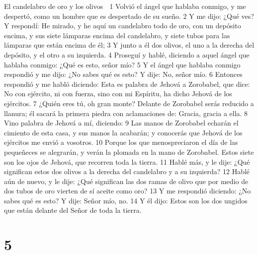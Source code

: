 El candelabro de oro y los olivos

1 Volvió el ángel que hablaba conmigo, y me despertó, como un hombre que es despertado de su sueño.
2 Y me dijo: ¿Qué ves? Y respondí: He mirado, y he aquí un candelabro todo de oro, con un depósito encima, y sus siete lámparas encima del candelabro, y siete tubos para las lámparas que están encima de él;
3 Y junto a él dos olivos, el uno a la derecha del depósito, y el otro a su izquierda.
4 Proseguí y hablé, diciendo a aquel ángel que hablaba conmigo: ¿Qué es esto, señor mío?
5 Y el ángel que hablaba conmigo respondió y me dijo: ¿No sabes qué es esto? Y dije: No, señor mío.
6 Entonces respondió y me habló diciendo: Esta es palabra de Jehová a Zorobabel, que dice: No con ejército, ni con fuerza, sino con mi Espíritu, ha dicho Jehová de los ejércitos.
7 ¿Quién eres tú, oh gran monte? Delante de Zorobabel serás reducido a llanura; él sacará la primera piedra con aclamaciones de: Gracia, gracia a ella.
8 Vino palabra de Jehová a mí, diciendo:
9 Las manos de Zorobabel echarán el cimiento de esta casa, y sus manos la acabarán; y conocerás que Jehová de los ejércitos me envió a vosotros.
10 Porque los que menospreciaron el día de las pequeñeces se alegrarán, y verán la plomada en la mano de Zorobabel. Estos siete son los ojos de Jehová, que recorren toda la tierra.
11 Hablé más, y le dije: ¿Qué significan estos dos olivos a la derecha del candelabro y a su izquierda?
12 Hablé aún de nuevo, y le dije: ¿Qué significan las dos ramas de olivo que por medio de dos tubos de oro vierten de sí aceite como oro?
13 Y me respondió diciendo: ¿No sabes qué es esto? Y dije: Señor mío, no.
14 Y él dijo: Estos son los dos ungidos que están delante del Señor de toda la tierra.

\chapter{5}

